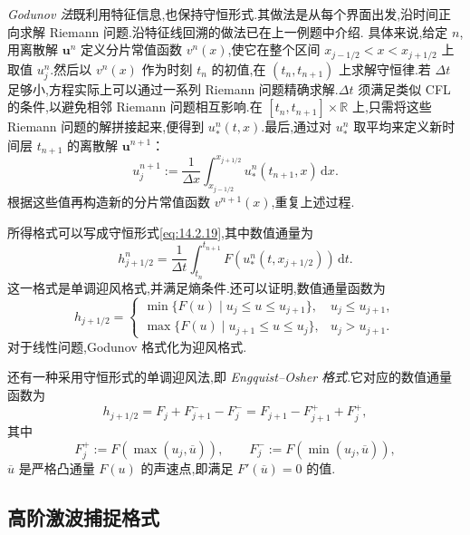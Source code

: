 \begin{example}[Godunov 格式]\label{ex:14.2.godunov}
\emph{Godunov 法}既利用特征信息,也保持守恒形式.其做法是从每个界面出发,沿时间正向求解 Riemann 问题.沿特征线回溯的做法已在上一例题中介绍.
具体来说,给定 \(n\),用离散解 \(\boldsymbol{u}^n\) 定义分片常值函数 \(v^n(x)\),使它在整个区间 \(x_{j-1/2}<x<x_{j+1/2}\) 上取值 \(u_j^n\).然后以 \(v^n(x)\) 作为时刻 \(t_n\) 的初值,在 \((t_n,t_{n+1})\) 上求解守恒律.若 \(\Delta t\) 足够小,方程实际上可以通过一系列 Riemann 问题精确求解.\(\Delta t\) 须满足类似 CFL 的条件,以避免相邻 Riemann 问题相互影响.在 \([t_n,t_{n+1}]\times\mathbb R\) 上,只需将这些 Riemann 问题的解拼接起来,便得到 \(u_*^n(t,x)\).最后,通过对 \(u_*^n\) 取平均来定义新时间层 \(t_{n+1}\) 的离散解 \(\boldsymbol{u}^{n+1}\)：
\[
  u_j^{n+1}:=\frac1{\Delta x}\int_{x_{j-1/2}}^{x_{j+1/2}}
                    u_*^n(t_{n+1},x)\,\mathrm dx.
\]
根据这些值再构造新的分片常值函数 \(v^{n+1}(x)\),重复上述过程.

所得格式可以写成守恒形式\eqref{eq:14.2.19},其中数值通量为
\begin{equation}\label{eq:14.2.31}
  h_{j+1/2}^n=\frac1{\Delta t}\int_{t_n}^{t_{n+1}}
                 F(u_*^n(t,x_{j+1/2}))\,\mathrm dt.
\end{equation}
这一格式是单调迎风格式,并满足熵条件.还可以证明,数值通量函数为
\[
  h_{j+1/2}=
  \begin{cases}
    \min\{F(u)\mid u_j\le u\le u_{j+1}\}, & u_j\le u_{j+1},\\
    \max\{F(u)\mid u_{j+1}\le u\le u_j\}, & u_j>u_{j+1}.
  \end{cases}
\]
对于线性问题,Godunov 格式化为迎风格式.
\end{example}

\begin{example}\label{ex:14.2.engquist-osher}
还有一种采用守恒形式的单调迎风法,即 \emph{Engquist--Osher 格式}.它对应的数值通量函数为
\begin{equation}\label{eq:14.2.32}
  h_{j+1/2}=F_j+F_{j+1}^--F_j^-=F_{j+1}-F_{j+1}^++F_j^+,
\end{equation}
其中
\[
  F_j^+:=F(\max(u_j,\overline u)),\qquad
  F_j^-:=F(\min(u_j,\overline u)),
\]
\(\overline u\) 是严格凸通量 \(F(u)\) 的声速点,即满足 \(F'(\overline u)=0\) 的值.
\end{example}

\subsection{高阶激波捕捉格式}\label{sec:14.2.4}

